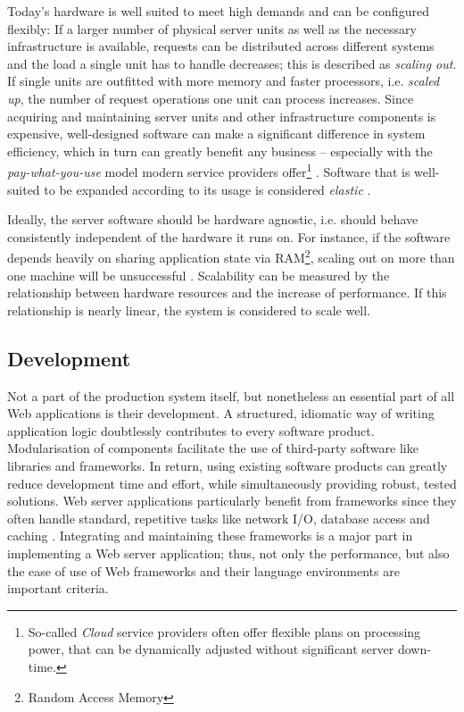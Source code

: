 Today's hardware is well suited to meet high demands and can be configured flexibly: If a larger number of physical server units as well as the necessary infrastructure is available, requests can be distributed across different systems and the load a single unit has to handle decreases; this is described as \textit{scaling out}. If single units are outfitted with more memory and faster processors, i.e. \textit{scaled up}, the number of request operations one unit can process increases. Since acquiring and maintaining server units and other infrastructure components is expensive, well-designed software can make a significant difference in system efficiency, which in turn can greatly benefit any business -- especially with the \textit{pay-what-you-use} model modern service providers offer\footnote{So-called \textit{Cloud} service providers often offer flexible plans on processing power, that can be dynamically adjusted without significant server down-time.} \cite[p. 11]{Hughes-Croucher2012}. Software that is well-suited to be expanded according to its usage is considered \textit{elastic} \cite{reactive}.

Ideally, the server software should be hardware agnostic, i.e. should behave consistently independent of the hardware it runs on. For instance, if the software depends heavily on sharing application state via RAM\footnote{Random Access Memory}, scaling out on more than one machine will be unsuccessful \cite{Veal2007}. Scalability can be measured by the relationship between hardware resources and the increase of performance. If this relationship is nearly linear, the system is considered to scale well.

\subsection{Development}
Not a part of the production system itself, but nonetheless an essential part of all Web applications is their development. A structured, idiomatic way of writing application logic doubtlessly contributes to every software product. Modularisation of components facilitate the use of third-party software like libraries and frameworks. In return, using existing software products can greatly reduce development time and effort, while simultaneously providing robust, tested solutions. Web server applications particularly benefit from frameworks since they often handle standard, repetitive tasks like network I/O, database access and caching \cite[p. 1]{Reelsen2011}. Integrating and maintaining these frameworks is a major part in implementing a Web server application; thus, not only the performance, but also the ease of use of Web frameworks and their language environments are important criteria.



